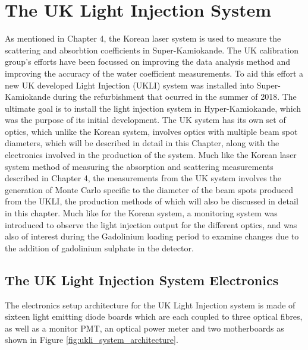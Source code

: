 \chapter{The UK Light Injection System}
\label{chp:ukli}

As mentioned in Chapter 4, the Korean laser system is used to measure the scattering and absorbtion coefficients in Super-Kamiokande. The UK calibration group's efforts have been focussed on improving the data analysis method and improving the accuracy of the water coefficient measurements. To aid this effort a new UK developed Light Injection (UKLI) system was installed into Super-Kamiokande during the refurbishment that ocurred in the summer of 2018. The ultimate goal is to install the light injection system in Hyper-Kamiokande, which was the purpose of its initial development. The UK system has its own set of optics, which unlike the Korean system, involves optics with multiple beam spot diameters, which will be described in detail in this Chapter, along with the electronics involved in the production of the system. Much like the Korean laser system method of measuring the absorption and scattering measurements described in Chapter 4, the measurements from the UK system involves the generation of Monte Carlo specific to the diameter of the beam spots produced from the UKLI, the production methods of which will also be discussed in detail in this chapter. Much like for the Korean system, a monitoring system was introduced to observe the light injection output for the different optics, and was also of interest during the Gadolinium loading period to examine changes due to the addition of gadolinium sulphate in the detector. 

\section{The UK Light Injection System Electronics}

The electronics setup architecture for the UK Light Injection system is made of sixteen light emitting diode boards which are each coupled to three optical fibres, as well as a monitor PMT, an optical power meter and two motherboards as shown in Figure \ref{fig:ukli_system_architecture}. 

